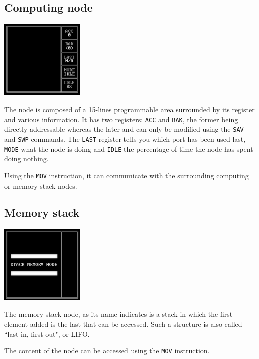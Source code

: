 \documentclass[10pt,a4paper]{article}
\theoremstyle{definition}%
\begin{document}
\subsection{Computing node}
\begin{center}
	\includegraphics[width=4cm]{computing-node.png}
\end{center}

The node is composed of a 15-lines programmable area surrounded by its register and various information.
It has two registers: \texttt{ACC} and \texttt{BAK}, the former being directly addressable whereas the later and can only be modified using the \texttt{SAV} and \texttt{SWP} commands.
The \texttt{LAST} register tells you which port has been used last, \texttt{MODE} what the node is doing and \texttt{IDLE} the percentage of time the node has spent doing nothing.

Using the \texttt{MOV} instruction, it can communicate with the surrounding computing or memory stack nodes.



\subsection{Memory stack}
\begin{center}
	\includegraphics[width=4cm]{memory-stack-node.png}
\end{center}

The memory stack node, as its name indicates is a stack in which the first element added is the last that can be accessed.
Such a structure is also called ``last in, first out", or LIFO.

The content of the node can be accessed using the \texttt{MOV} instruction.
\end{document}
